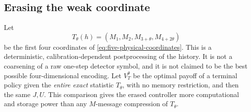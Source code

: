 \subsection{Erasing the weak coordinate}
Let
\begin{equation}\label{eq:jet-erasure}
 T_\theta(h)=(M_1,M_2,M_{3+\theta},M_{4+2\theta})
\end{equation}
be the first four coordinates of \eqref{eq:five-physical-coordinates}.
This is a deterministic, calibration-dependent postprocessing of the
history. It is not a coarsening of a raw one-step detector symbol, and it
is not claimed to be the best possible four-dimensional encoding.
Let $V_T^\theta$ be the optimal payoff of a terminal policy given the
\emph{entire exact} statistic $T_\theta$, with no memory restriction,
and then the same $J,U$. This comparison gives the erased controller
more computational and storage power than any $M$-message compression
of $T_\theta$.


